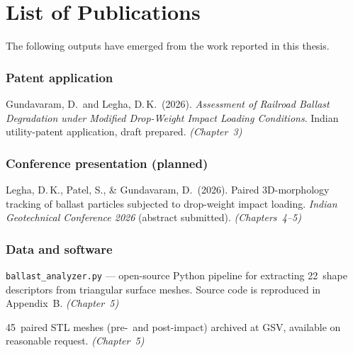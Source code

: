 \clearpage
\chapter*{List of Publications}
\thispagestyle{plain}

The following outputs have emerged from the work reported in this thesis.

\bigskip

\subsection*{Patent application}

\begin{enumerate}[label={[P\arabic*]},leftmargin=3em]
    \item Gundavaram, D.\ and Legha, D.\,K.\ (2026).
        \textit{Assessment of Railroad Ballast Degradation under Modified
        Drop-Weight Impact Loading Conditions}.
        Indian utility-patent application, draft prepared.
        \hfill\textit{(Chapter~3)}
\end{enumerate}

\subsection*{Conference presentation (planned)}

\begin{enumerate}[label={[C\arabic*]},leftmargin=3em]
    \item Legha, D.\,K., Patel, S., \& Gundavaram, D.\ (2026).
        Paired 3D-morphology tracking of ballast particles subjected
        to drop-weight impact loading.
        \textit{Indian Geotechnical Conference 2026} (abstract
        submitted).
        \hfill\textit{(Chapters~4--5)}
\end{enumerate}

\subsection*{Data and software}

\begin{enumerate}[label={[D\arabic*]},leftmargin=3em]
    \item \texttt{ballast\_analyzer.py} --- open-source Python pipeline
        for extracting 22~shape descriptors from triangular
        surface meshes.  Source code is reproduced in Appendix~B.
        \hfill\textit{(Chapter~5)}
    \item 45~paired \gls{STL} meshes (pre-\ and post-impact) archived
        at \gls{GSV}, available on reasonable request.
        \hfill\textit{(Chapter~5)}
\end{enumerate}
